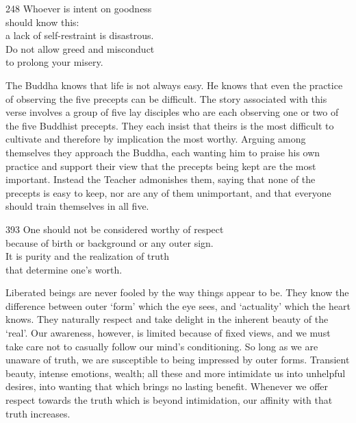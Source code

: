 
\begin{dhpVerse}{248}
\label{dhp-248}
Whoever is intent on goodness\\
should know this:\\
a lack of self-restraint is disastrous.\\
Do not allow greed and misconduct\\
to prolong your misery.
\end{dhpVerse}

\begin{dhpRefl}
  The Buddha knows that life is not always easy. He knows that even the practice
  of observing the five precepts can be difficult. The story associated with
  this verse involves a group of five lay disciples who are each observing one
  or two of the five Buddhist precepts. They each insist that theirs is the most
  difficult to cultivate and therefore by implication the most worthy. Arguing
  among themselves they approach the Buddha, each wanting him to praise his own
  practice and support their view that the precepts being kept are the most
  important. Instead the Teacher admonishes them, saying that none of the
  precepts is easy to keep, nor are any of them unimportant, and that everyone
  should train themselves in all five.
\end{dhpRefl}


\begin{dhpVerse}{393}
\label{dhp-393}
One should not be considered worthy of respect\\
because of birth or background or any outer sign.\\
It is purity and the realization of truth\\
that determine one's worth.
\end{dhpVerse}

\begin{dhpRefl}
  Liberated beings are never fooled by the way things appear to be. They know
  the difference between outer ‘form’ which the eye sees, and ‘actuality’ which
  the heart knows. They naturally respect and take delight in the inherent
  beauty of the ‘real’. Our awareness, however, is limited because of fixed
  views, and we must take care not to casually follow our mind’s conditioning.
  So long as we are unaware of truth, we are susceptible to being impressed by
  outer forms. Transient beauty, intense emotions, wealth; all these and more
  intimidate us into unhelpful desires, into wanting that which brings no
  lasting benefit. Whenever we offer respect towards the truth which is beyond
  intimidation, our affinity with that truth increases.
\end{dhpRefl}

